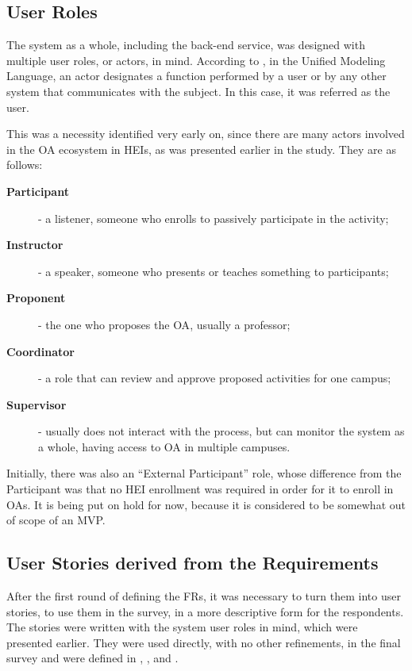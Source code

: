 \subsection{User Roles}\label{ext:user-roles}

The system as a whole, including the back-end service, was designed with multiple user roles, or actors, in mind. According to \textcite{omg_2017}, in the Unified Modeling Language, an actor designates a function performed by a user or by any other system that communicates with the subject. In this case, it was referred as the user.

This was a necessity identified very early on, since there are many actors involved in the \ac{OA} ecosystem in \acp{HEI}, as was presented earlier in the study. They are as follows:
\begin{description}
  \item[\textbf{Participant}] - a listener, someone who enrolls to passively participate in the activity;
  \item[\textbf{Instructor}] - a speaker, someone who presents or teaches something to participants;
  \item[\textbf{Proponent}] - the one who proposes the \ac{OA}, usually a professor;
  \item[\textbf{Coordinator}] - a role that can review and approve proposed activities for one campus;
  \item[\textbf{Supervisor}] - usually does not interact with the process, but can monitor the system as a whole, having access to \ac{OA} in multiple campuses.
\end{description}
Initially, there was also an ``External Participant'' role, whose difference from the Participant was that no \ac{HEI} enrollment was required in order for it to enroll in \acp{OA}. It is being put on hold for now, because it is considered to be somewhat out of scope of an \ac{MVP}.

\subsection{User Stories derived from the Requirements}\label{ext:user-stories}

After the first round of defining the \acp{FR}, it was necessary to turn them into user stories, to use them in the survey, in a more descriptive form for the respondents. The stories were written with the system user roles in mind, which were presented earlier. They were used directly, with no other refinements, in the final survey and were defined in , ,  and .

